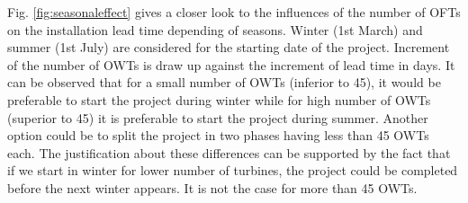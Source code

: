Fig. \ref{fig:seasonaleffect} gives a closer look to the influences of the number of OFTs on the installation lead time depending of seasons. Winter (1st March) and summer (1st July) are considered for the starting date of the project. Increment of the number of OWTs is draw up against the increment of lead time in days. It can be observed that for a small number of OWTs (inferior to 45), it would be preferable to start the project during winter while for high number of OWTs (superior to 45) it is preferable to start the project during summer. Another option could be to split the project in two phases having less than 45 OWTs each. The justification about these differences can be supported by the fact that if we start in winter for lower number of turbines, the project could be completed before the next winter appears. It is not the case for more than 45 OWTs.
